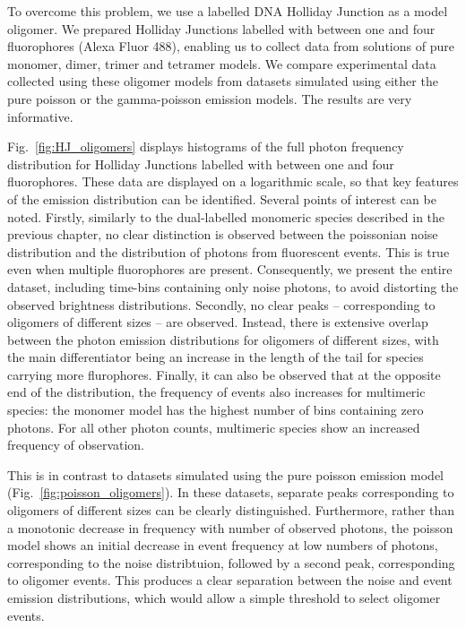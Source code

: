 To overcome this problem, we use a labelled DNA Holliday Junction as a model oligomer. We prepared Holliday Junctions labelled with between one and four fluorophores (Alexa Fluor 488), enabling us to collect data from solutions of pure monomer, dimer, trimer and tetramer models. We compare experimental data collected using these oligomer models from datasets simulated using either the pure poisson or the gamma-poisson emission models. The results are very informative.

Fig.~\ref{fig:HJ_oligomers} displays histograms of the full photon frequency distribution for Holliday Junctions labelled with between one and four fluorophores. These data are displayed on a logarithmic scale, so that key features of the emission distribution can be identified. Several points of interest can be noted. Firstly, similarly to the dual-labelled monomeric species described in the previous chapter, no clear distinction is observed between the poissonian noise distribution and the distribution of photons from fluorescent events. This is true even when multiple fluorophores are present. Consequently, we present the entire dataset, including time-bins containing only noise photons, to avoid distorting the observed brightness distributions. Secondly, no clear peaks -- corresponding to oligomers of different sizes -- are observed. Instead, there is extensive overlap between the photon emission distributions for oligomers of different sizes, with the main differentiator being an increase in the length of the tail for species carrying more flurophores. Finally, it can also be observed that at the opposite end of the distribution, the frequency of events also increases for multimeric species: the monomer model has the highest number of bins containing zero photons. For all other photon counts, multimeric species show an increased frequency of observation. 

This is in contrast to datasets simulated using the pure poisson emission model (Fig.~\ref{fig:poisson_oligomers}). In these datasets, separate peaks corresponding to oligomers of different sizes can be clearly distinguished. Furthermore, rather than a monotonic decrease in frequency with number of observed photons, the poisson model shows an initial decrease in event frequency at low numbers of photons, corresponding to the noise distribtuion, followed by a second peak, corresponding to oligomer events. This produces a clear separation between the noise and event emission distributions, which would allow a simple threshold to select oligomer events. 

